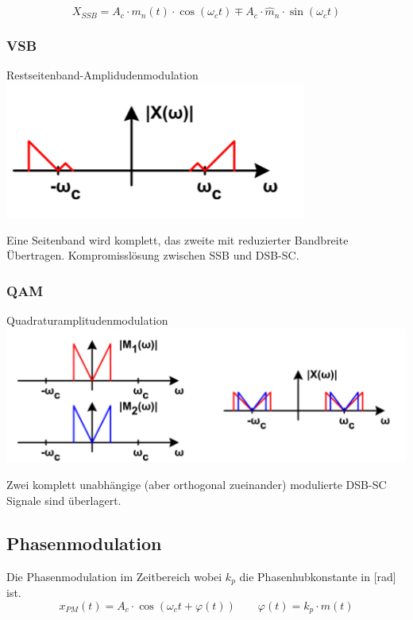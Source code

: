 \[X_{SSB} = A_c \cdot m_n(t) \cdot \cos(\omega_ct) \mp A_c\cdot \hat{m}_n\cdot \sin(\omega_ct)\]

\subsubsection{VSB}
Restseitenband-Amplidudenmodulation\\
\includegraphics[width=0.5\columnwidth]{Images/vsb}

Eine Seitenband wird komplett, das zweite mit reduzierter Bandbreite Übertragen. Kompromisslösung zwischen SSB und DSB-SC.

\subsubsection{QAM}
Quadraturamplitudenmodulation\\
\includegraphics[width=0.5\columnwidth]{Images/qam}

Zwei komplett unabhängige (aber orthogonal zueinander) modulierte DSB-SC Signale sind überlagert.


\subsection{Phasenmodulation}
Die Phasenmodulation im Zeitbereich wobei $k_p$ die Phasenhubkonstante in [rad] ist.
\[
x_{PM}(t) = A_c\cdot \cos(\omega_ct + \varphi(t)) \qquad \varphi(t) = k_p\cdot m(t)
\]

